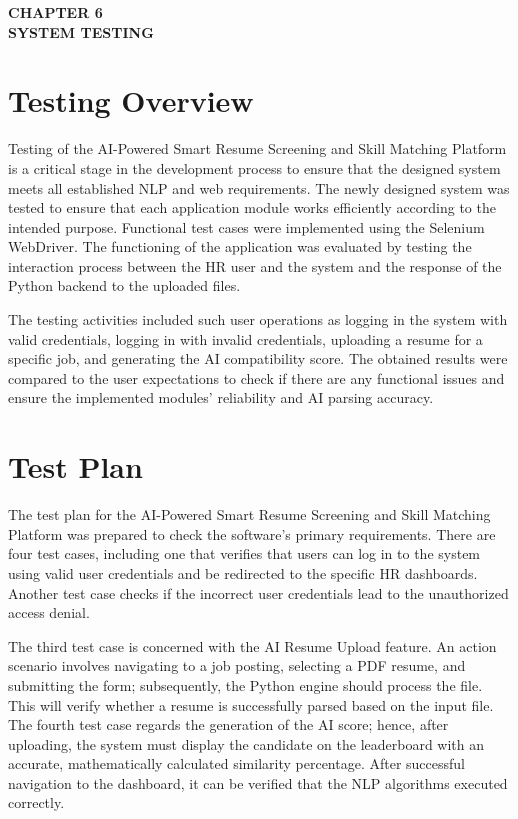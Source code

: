 \documentclass[12pt,a4paper]{report}
\begin{document}
\thispagestyle{empty}

\vspace*{\fill}

\begin{center}
    {\fontsize{14pt}{17pt}\selectfont\textbf{CHAPTER 6}}\\[1cm]
    {\fontsize{14pt}{17pt}\selectfont\textbf{SYSTEM TESTING}}
\end{center}

\vspace*{\fill}

\clearpage


\section{Testing Overview}

Testing of the AI-Powered Smart Resume Screening and Skill Matching Platform is a critical stage in the development process to ensure that the designed system meets all established NLP and web requirements. The newly designed system was tested to ensure that each application module works efficiently according to the intended purpose. Functional test cases were implemented using the Selenium WebDriver. The functioning of the application was evaluated by testing the interaction process between the HR user and the system and the response of the Python backend to the uploaded files.

The testing activities included such user operations as logging in the system with valid credentials, logging in with invalid credentials, uploading a resume for a specific job, and generating the AI compatibility score. The obtained results were compared to the user expectations to check if there are any functional issues and ensure the implemented modules’ reliability and AI parsing accuracy.

\section{Test Plan}

The test plan for the AI-Powered Smart Resume Screening and Skill Matching Platform was prepared to check the software’s primary requirements. There are four test cases, including one that verifies that users can log in to the system using valid user credentials and be redirected to the specific HR dashboards. Another test case checks if the incorrect user credentials lead to the unauthorized access denial.

The third test case is concerned with the AI Resume Upload feature. An action scenario involves navigating to a job posting, selecting a PDF resume, and submitting the form; subsequently, the Python engine should process the file. This will verify whether a resume is successfully parsed based on the input file. The fourth test case regards the generation of the AI score; hence, after uploading, the system must display the candidate on the leaderboard with an accurate, mathematically calculated similarity percentage. After successful navigation to the dashboard, it can be verified that the NLP algorithms executed correctly.
\end{document}

